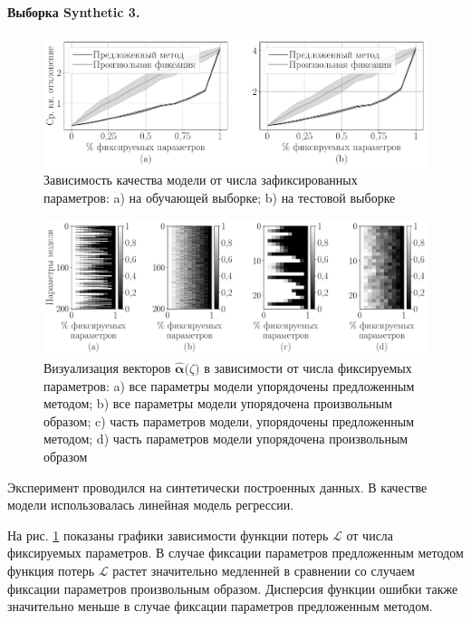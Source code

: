 \paragraph{Выборка Synthetic 3.}
\begin{figure}[h!t]\center
\includegraphics[width=1\textwidth]{results/order/generate_data_linear_loss}
\caption{Зависимость качества модели от числа зафиксированных параметров: a) на обучающей выборке; b) на тестовой выборке}
\label{fg:ex:syn1:1}
\end{figure}

\begin{figure}[h!t]\center
\includegraphics[width=1\textwidth]{results/order/generate_data_linear_matshow}
\caption{Визуализация векторов $\hat{\bm{\alpha}}\bigr(\zeta\bigr)$ в зависимости от числа фиксируемых параметров: a) все параметры модели упорядочены предложенным методом; b) все параметры модели упорядочена произвольным образом; c) часть параметров модели, упорядочены предложенным методом; d) часть параметров модели упорядочена произвольным образом}
\label{fg:ex:syn1:2}
\end{figure}

Эксперимент проводился на синтетически построенных данных. В качестве модели использовалась линейная модель регрессии.

На рис. \ref{fg:ex:syn1:1} показаны графики зависимости функции потерь $\mathcal{L}$ от числа фиксируемых параметров. В случае фиксации параметров предложенным методом функция потерь $\mathcal{L}$ растет значительно медленней в сравнении со случаем фиксации параметров произвольным образом. Дисперсия функции ошибки также значительно меньше в случае фиксации параметров предложенным методом.

